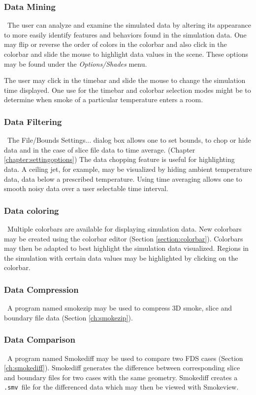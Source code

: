 \documentclass[11pt,twoside]{book}
\begin{document}
\subsubsection{Data Mining}\ The user can analyze and examine the simulated
data by altering its appearance to more easily identify features
and behaviors found in the simulation data. One may flip or
reverse the order of colors in the colorbar and also click in the
colorbar and slide the mouse to highlight data values in the
scene. These options may be found under the {\em Options/Shades}
menu.

The user may click in the timebar and slide the mouse to
change the simulation time displayed. One use for the timebar and colorbar selection modes might be to determine
when smoke of a particular temperature enters a room.

\subsubsection{Data Filtering}\ The File/Bounds Settings...
dialog box allows one to set bounds, to chop or hide data and in the case
of slice file data to time average. (Chapter \ref{chapter:settingoptions})
The data chopping
feature is useful for highlighting data.  A ceiling jet, for example,
may be visualized by hiding ambient temperature
data,  data below a prescribed temperature.
Using time averaging allows one to smooth noisy data over a user selectable time
interval.

\subsubsection{Data coloring}\ Multiple colorbars are available for displaying simulation data.
New colorbars may be created using the colorbar editor (Section \ref{section:colorbar}).
Colorbars may then be adapted to best highlight the simulation data visualized.
Regions in the simulation with certain data values may be highlighted by clicking
on the colorbar.

\subsubsection{Data Compression}\ A program named smokezip may be used to compress 3D smoke, slice and boundary file data (Section \ref{ch:smokezip}).

\subsubsection{Data Comparison}\ A program named Smokediff
may be used to compare two FDS cases (Section \ref{ch:smokediff}).
Smokediff generates the difference between corresponding slice and boundary
files for two cases with the same geometry.  Smokediff creates a
{\tt .smv}\ file for the differenced data which may then be viewed with Smokeview.
\end{document}

